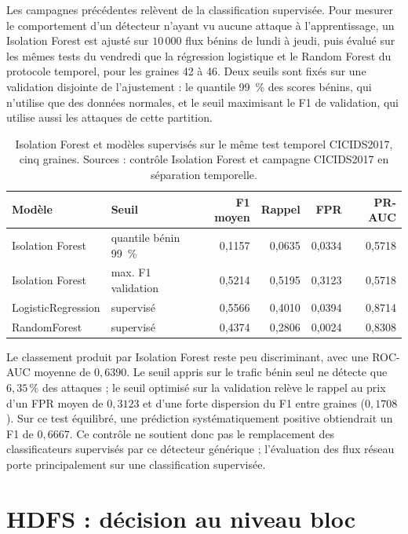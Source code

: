 Les campagnes précédentes relèvent de la classification supervisée. Pour mesurer le comportement d'un détecteur n'ayant vu aucune attaque à l'apprentissage, un Isolation Forest \cite{liu2008isolation} est ajusté sur $10\,000$ flux bénins de lundi à jeudi, puis évalué sur les mêmes tests du vendredi que la régression logistique et le Random Forest du protocole temporel, pour les graines 42 à 46. Deux seuils sont fixés sur une validation disjointe de l'ajustement : le quantile 99~\% des scores bénins, qui n'utilise que des données normales, et le seuil maximisant le F1 de validation, qui utilise aussi les attaques de cette partition.

\begin{table}[H]
\centering
\caption[Contrôle Isolation Forest sur CICIDS2017.]{Isolation Forest et modèles supervisés sur le même test temporel CICIDS2017, cinq graines. Sources : contrôle Isolation Forest et campagne CICIDS2017 en séparation temporelle.}
\label{tab:cicids-iforest}
\small
\begin{tabular}{llrrrr}
\toprule
\textbf{Modèle} & \textbf{Seuil} & \textbf{F1 moyen} & \textbf{Rappel} & \textbf{FPR} & \textbf{PR-AUC} \\
\midrule
Isolation Forest & quantile bénin 99~\% & 0,1157 & 0,0635 & 0,0334 & 0,5718 \\
Isolation Forest & max. F1 validation & 0,5214 & 0,5195 & 0,3123 & 0,5718 \\
LogisticRegression & supervisé & 0,5566 & 0,4010 & 0,0394 & 0,8714 \\
RandomForest & supervisé & 0,4374 & 0,2806 & 0,0024 & 0,8308 \\
\bottomrule
\end{tabular}
\end{table}

Le classement produit par Isolation Forest reste peu discriminant, avec une ROC-AUC moyenne de $0{,}6390$. Le seuil appris sur le trafic bénin seul ne détecte que $6{,}35\,\%$ des attaques ; le seuil optimisé sur la validation relève le rappel au prix d'un FPR moyen de $0{,}3123$ et d'une forte dispersion du F1 entre graines ($0{,}1708$). Sur ce test équilibré, une prédiction systématiquement positive obtiendrait un F1 de $0{,}6667$. Ce contrôle ne soutient donc pas le remplacement des classificateurs supervisés par ce détecteur générique ; l'évaluation des flux réseau porte principalement sur une classification supervisée.

\section{HDFS : décision au niveau bloc}

